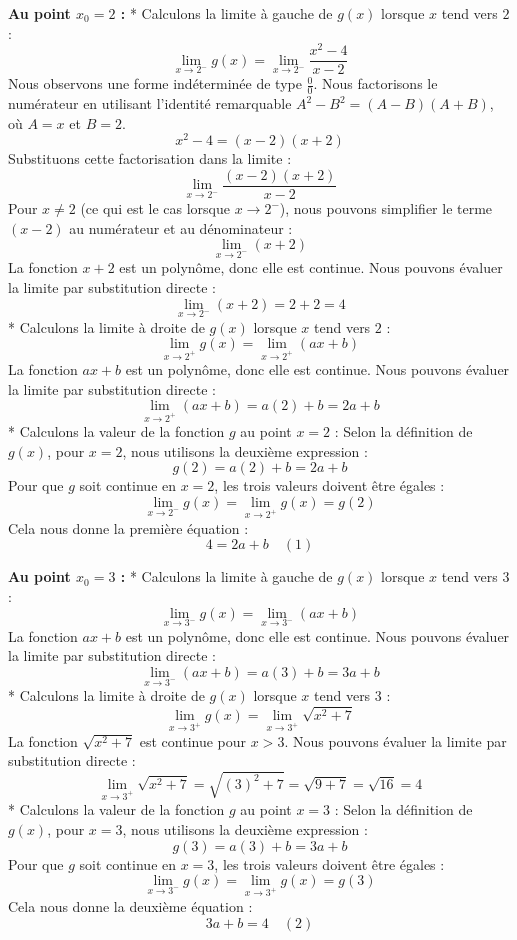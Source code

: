 \documentclass[12pt,a4paper]{report}
\begin{document}
    \textbf{Au point $x_0 = 2$ :}
    *   Calculons la limite à gauche de $g(x)$ lorsque $x$ tend vers $2$ :
        $$ \lim_{x \to 2^-} g(x) = \lim_{x \to 2^-} \frac{x^2 - 4}{x - 2} $$
        Nous observons une forme indéterminée de type $\frac{0}{0}$. Nous factorisons le numérateur en utilisant l'identité remarquable $A^2 - B^2 = (A - B)(A + B)$, où $A=x$ et $B=2$.
        $$ x^2 - 4 = (x - 2)(x + 2) $$
        Substituons cette factorisation dans la limite :
        $$ \lim_{x \to 2^-} \frac{(x - 2)(x + 2)}{x - 2} $$
        Pour $x \ne 2$ (ce qui est le cas lorsque $x \to 2^-$), nous pouvons simplifier le terme $(x - 2)$ au numérateur et au dénominateur :
        $$ \lim_{x \to 2^-} (x + 2) $$
        La fonction $x+2$ est un polynôme, donc elle est continue. Nous pouvons évaluer la limite par substitution directe :
        $$ \lim_{x \to 2^-} (x + 2) = 2 + 2 = 4 $$
    *   Calculons la limite à droite de $g(x)$ lorsque $x$ tend vers $2$ :
        $$ \lim_{x \to 2^+} g(x) = \lim_{x \to 2^+} (ax + b) $$
        La fonction $ax+b$ est un polynôme, donc elle est continue. Nous pouvons évaluer la limite par substitution directe :
        $$ \lim_{x \to 2^+} (ax + b) = a(2) + b = 2a + b $$
    *   Calculons la valeur de la fonction $g$ au point $x = 2$ :
        Selon la définition de $g(x)$, pour $x = 2$, nous utilisons la deuxième expression :
        $$ g(2) = a(2) + b = 2a + b $$
    Pour que $g$ soit continue en $x = 2$, les trois valeurs doivent être égales :
    $$ \lim_{x \to 2^-} g(x) = \lim_{x \to 2^+} g(x) = g(2) $$
    Cela nous donne la première équation :
    $$ 4 = 2a + b \quad (1) $$

    \textbf{Au point $x_0 = 3$ :}
    *   Calculons la limite à gauche de $g(x)$ lorsque $x$ tend vers $3$ :
        $$ \lim_{x \to 3^-} g(x) = \lim_{x \to 3^-} (ax + b) $$
        La fonction $ax+b$ est un polynôme, donc elle est continue. Nous pouvons évaluer la limite par substitution directe :
        $$ \lim_{x \to 3^-} (ax + b) = a(3) + b = 3a + b $$
    *   Calculons la limite à droite de $g(x)$ lorsque $x$ tend vers $3$ :
        $$ \lim_{x \to 3^+} g(x) = \lim_{x \to 3^+} \sqrt{x^2 + 7} $$
        La fonction $\sqrt{x^2+7}$ est continue pour $x > 3$. Nous pouvons évaluer la limite par substitution directe :
        $$ \lim_{x \to 3^+} \sqrt{x^2 + 7} = \sqrt{(3)^2 + 7} = \sqrt{9 + 7} = \sqrt{16} = 4 $$
    *   Calculons la valeur de la fonction $g$ au point $x = 3$ :
        Selon la définition de $g(x)$, pour $x = 3$, nous utilisons la deuxième expression :
        $$ g(3) = a(3) + b = 3a + b $$
    Pour que $g$ soit continue en $x = 3$, les trois valeurs doivent être égales :
    $$ \lim_{x \to 3^-} g(x) = \lim_{x \to 3^+} g(x) = g(3) $$
    Cela nous donne la deuxième équation :
    $$ 3a + b = 4 \quad (2) $$
\end{document}
